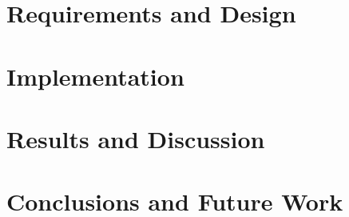 \documentclass[12pt,a4paper]{report}
\begin{document}


\chapter{Requirements and Design}




\chapter{Implementation} \label{chap:implementation}



\chapter{Results and Discussion}



\chapter{Conclusions and Future Work}




\end{document}
